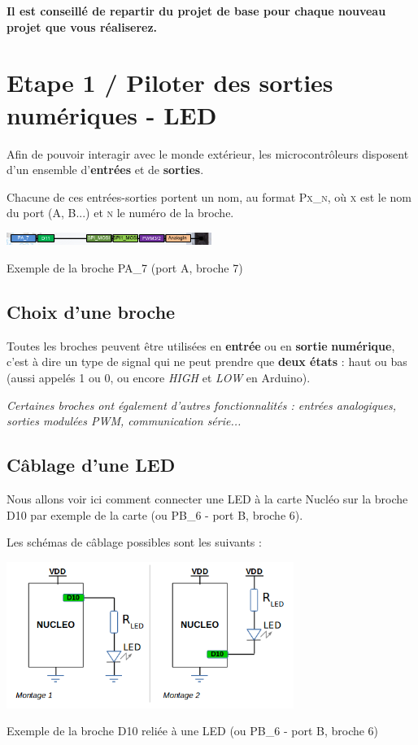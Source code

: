 \documentclass[a4paper,11pt,titlepage]{article} %
\begin{document}
\textbf{Il est conseillé de repartir du projet de base pour chaque nouveau projet que vous réaliserez.}


\cleardoublepage
\section{Etape 1 / Piloter des sorties numériques - LED}

Afin de pouvoir interagir avec le monde extérieur, les microcontrôleurs disposent d'un ensemble d'\textbf{entrées} et de \textbf{sorties}. 

Chacune de ces entrées-sorties portent un nom, au format \textsc{Px\_n}, où \textsc{x} est le nom du port (A, B...) et \textsc{n} le numéro de la broche.

\begin{center}
	\includegraphics[width=0.5\textwidth]{images/nucleo_pin_functions.png}
	
	Exemple de la broche PA\_7 (port A, broche 7)
\end{center}


\subsection{Choix d'une broche}

Toutes les broches peuvent être utilisées en \textbf{entrée} ou en \textbf{sortie} \textbf{numérique}, c'est à dire un type de signal qui ne peut prendre que \textbf{deux états} : haut ou bas (aussi appelés 1 ou 0, ou encore \textit{HIGH} et \textit{LOW} en Arduino). 

\textit{Certaines broches ont également d'autres fonctionnalités : entrées analogiques, sorties modulées PWM, communication série...}


\subsection{Câblage d'une LED}

Nous allons voir ici comment connecter une LED à la carte Nucléo sur la broche D10 par exemple de la carte (ou PB\_6 - port B, broche 6).

Les schémas de câblage possibles sont les suivants :

\begin{center}
	\includegraphics[width=0.7\textwidth]{images/MINE_Nucleo_LED_Connexion.png}
	
	Exemple de la broche D10 reliée à une LED (ou PB\_6 - port B, broche 6)
\end{center}
\end{document}
